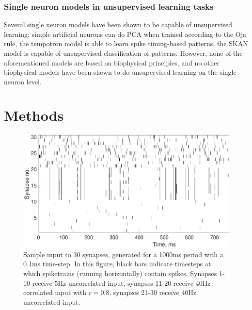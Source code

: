 \documentclass[a4paper,12pt]{report}
\theoremstyle{definition}
\begin{document}


\subsection{Single neuron models in unsupervised learning tasks}

Several single neuron models have been shown to be capable of unsupervised learning: simple artificial neurons can do PCA when trained according to the Oja rule, the tempotron model \cite{gutig2006tempotron} is able to learn spike timing-based patterns, the SKAN model \cite{afshar2014racing} is capable of unsupervised classification of patterns. However, none of the aforementioned models are based on biophysical principles, and no other biophysical models have been shown to do unsupervised learning on the single neuron level.





\chapter{Methods}

\begin{figure}[h]
    \includegraphics[width=\textwidth]{figures/methods_sample_input.eps}
    \caption{Sample input to 30 synapses, generated for a 1000ms period with a 0.1ms time-step. In this figure, black bars indicate timesteps at which spiketrains (running horizontally) contain spikes. Synapses 1-10 receive 5Hz uncorrelated input, synapses 11-20 receive 40Hz correlated input with $c=0.8$, synapses 21-30 receive 40Hz uncorrelated input.}
    \label{fig:methods_sample_input}
\end{figure}
\end{document}
